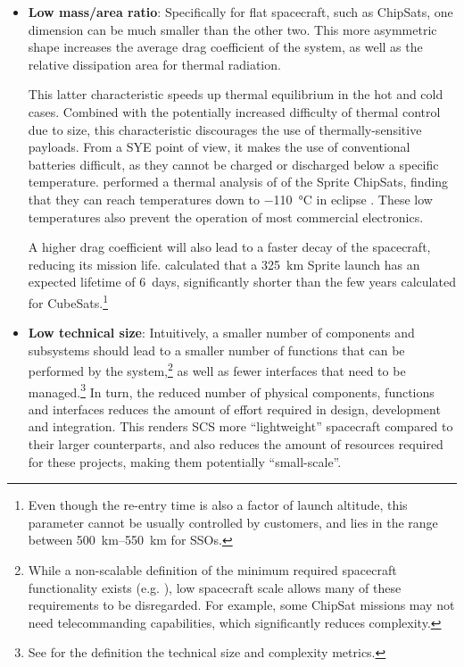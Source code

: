 \documentclass[a4paper,nobib,justified,final]{tufte-book}
\begin{document}
\begin{itemize}
	\item \textbf{Low mass/area ratio}: Specifically for flat spacecraft, such as ChipSats, one dimension can be much smaller than the other two. This more asymmetric shape increases the average drag coefficient of the system, as well as the relative dissipation area for thermal radiation.
	
	This latter characteristic speeds up thermal equilibrium in the hot and cold cases. Combined with the potentially increased difficulty of thermal control due to size, this characteristic discourages the use of thermally-sensitive payloads. From a \acl{SYE} point of view, it makes the use of conventional batteries difficult, as they cannot be charged or discharged below a specific temperature. \citeauthor{manchesterCentimeterScaleSpacecraftDesign2015} performed a thermal analysis of of the Sprite ChipSats, finding that they can reach temperatures down to \qty{-110}{\degreeCelsius} in eclipse \autocite{manchesterCentimeterScaleSpacecraftDesign2015}. These low temperatures also prevent the operation of most commercial electronics.

	A higher drag coefficient will also lead to a faster decay of the spacecraft, reducing its mission life. \citeauthor{manchesterOrbitalDebrisAssessment2013} calculated that a \qty{325}{\kilo\meter} Sprite launch has an expected lifetime of \qty{6}{days}, significantly shorter than the few years calculated for CubeSats.\footnote{Even though the re-entry time is also a factor of launch altitude, this parameter cannot be usually controlled by customers, and lies in the range between \qtyrange{500}{550}{\kilo\meter} for \acsp{SSO}.}
	\item \textbf{Low technical size}: Intuitively, a smaller number of components and subsystems should lead to a smaller number of functions that can be performed by the system,\footnote{While a non-scalable definition of the minimum required spacecraft functionality exists (e.g. \autocite{ECSS-E-ST-70-11C}), low spacecraft scale allows many of these requirements to be disregarded. For example, some ChipSat missions may not need telecommanding capabilities, which significantly reduces complexity.} as well as fewer interfaces that need to be managed.\footnote{See  for the definition the technical size and complexity metrics.} In turn, the reduced number of physical components, functions and interfaces reduces the amount of effort required in design, development and integration. This renders \acs{SCS} more ``lightweight'' spacecraft compared to their larger counterparts, and also reduces the amount of resources required for these projects, making them potentially ``small-scale''.
	

\end{itemize}
\end{document}
